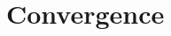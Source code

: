 \documentclass[journal,12pt,twocolumn]{IEEEtran}
\begin{document}
% 







\maketitle


%
\section{Convergence}
\end{document}
